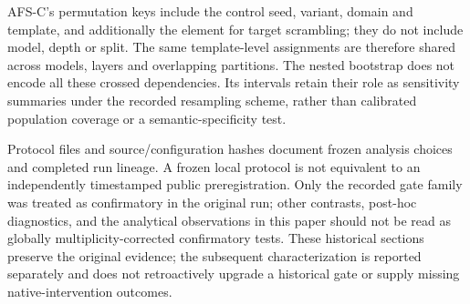 AFS-C's permutation keys include the control seed, variant, domain and template, and additionally the element for target scrambling; they do not include model, depth or split. The same template-level assignments are therefore shared across models, layers and overlapping partitions. The nested bootstrap does not encode all these crossed dependencies. Its intervals retain their role as sensitivity summaries under the recorded resampling scheme, rather than calibrated population coverage or a semantic-specificity test.

Protocol files and source/configuration hashes document frozen analysis choices and completed run lineage. A frozen local protocol is not equivalent to an independently timestamped public preregistration. Only the recorded gate family was treated as confirmatory in the original run; other contrasts, post-hoc diagnostics, and the analytical observations in this paper should not be read as globally multiplicity-corrected confirmatory tests. These historical sections preserve the original evidence; the subsequent characterization is reported separately and does not retroactively upgrade a historical gate or supply missing native-intervention outcomes.
